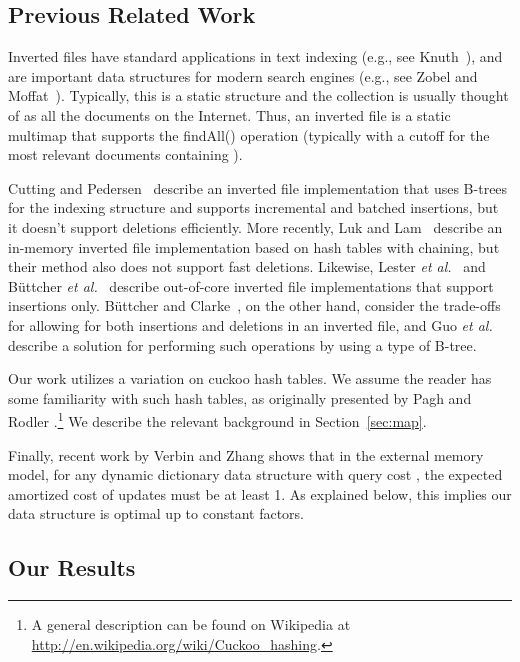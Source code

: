 \documentclass[11pt,letterpaper]{article}
\begin{document}
\subsection{Previous Related Work}

Inverted files have standard applications in 
text indexing (e.g., see Knuth~\cite{k-ss-73}),
and are important data structures
for modern search engines (e.g., see Zobel and Moffat~\cite{zm-iftse-06}).
Typically, this is a static structure and the collection  is
usually thought of as all the documents on the Internet.
Thus, an inverted file is a static multimap
that supports the findAll() operation (typically with a cutoff for
the most relevant documents containing ).

Cutting and Pedersen~\cite{cp-odiim-90} describe an inverted file
implementation that uses B-trees for the indexing structure and
supports incremental and batched insertions, but it doesn't support
deletions efficiently.
More recently, Luk and Lam~\cite{ll-eimef-07} describe an in-memory
inverted file implementation based on hash tables with chaining, but
their method also does not support fast deletions.
Likewise,
Lester {\it et al.}~\cite{lmz-eoict-08,lzw-eoimc-06} 
and B\"{u}ttcher {\it et al.}~\cite{bcl-himgt-06}
describe out-of-core
inverted file implementations that support insertions only.
B\"{u}ttcher and Clarke~\cite{bc-itvqt-05},
on the other hand, 
consider the trade-offs for allowing for
both insertions and deletions in an inverted file, 
and Guo {\it et al.}~\cite{gcxw-eoli-07}
describe a solution for performing such operations
by using a type of B-tree.

Our work utilizes a variation on cuckoo hash tables.  We assume the reader
has some familiarity with such hash tables, as originally presented by Pagh
and Rodler \cite{pr-ch-04}.\footnote{A general description can be found on Wikipedia
at \url{http://en.wikipedia.org/wiki/Cuckoo_hashing}.}  
We describe the relevant
background in Section~\ref{sec:map}.  

Finally, recent work by Verbin and Zhang \cite{vz} shows that in the external memory model,
for any dynamic dictionary data structure with query cost , the expected amortized cost of updates 
must be at least 1. As explained below, this implies our data structure is optimal up to constant factors. 
 
\subsection{Our Results}
\end{document}
